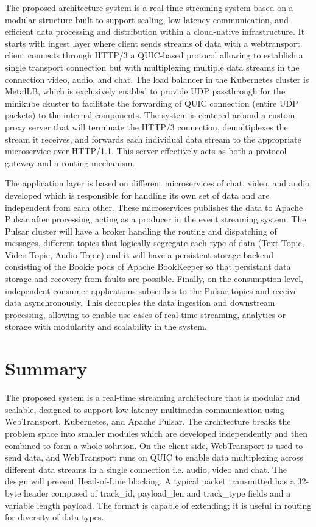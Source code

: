 The proposed architecture system is a real-time streaming system based on a modular structure built to support scaling, low latency communication, and efficient data processing and distribution within a cloud-native infrastructure. It starts with ingest layer where client sends streams of data with a webtransport client connects through HTTP/3 a QUIC-based protocol allowing to establish a single transport connection but with multiplexing multiple data streams in the connection video, audio, and chat. The load balancer in the Kubernetes cluster is MetalLB, which is exclusively enabled to provide UDP passthrough for the minikube ckuster to facilitate the forwarding of QUIC connection (entire UDP packets) to the internal components. The system is centered around a custom proxy server that will terminate the HTTP/3 connection, demultiplexes the stream it receives, and forwards each individual data stream to the appropriate microservice over HTTP/1.1. This server effectively acts as both a protocol gateway and a routing mechanism.

The application layer is based on different microservices of chat, video, and audio developed which is responsible for handling its own set of data and are independent from each other. These microservices publishes the data to Apache Pulsar after processing, acting as a producer in the event streaming system. The Pulsar cluster will have a broker handling the routing and dispatching of messages, different topics that logically segregate each type of data (Text Topic, Video Topic, Audio Topic) and it will have a persistent storage backend consisting of the Bookie pods of Apache BookKeeper so that persistant data storage and recovery from faults are possible. Finally, on the consumption level, independent consumer applications subscribes to the Pulsar topics and receive data asynchronously. This decouples the data ingestion and downstream processing, allowing to enable use cases of real-time streaming, analytics or storage with modularity and scalability in the system.
\label{sec:OverviewOfDesign}

\section {Summary}
The proposed system is a real-time streaming architecture that is modular and scalable, designed to support low-latency multimedia communication using WebTransport, Kubernetes, and Apache Pulsar. The architecture breaks the problem space into smaller modules which are developed independently and then combined to form a whole solution. On the client side, WebTransport is used to send data, and WebTransport runs on QUIC to enable data multiplexing across different data streams in a single connection i.e. audio, video and chat. The design will prevent Head-of-Line blocking. A typical packet transmitted has a 32-byte header composed of track\_id, payload\_len and track\_type fields and a variable length payload. The format is capable of extending; it is useful in routing for diversity of data types.

